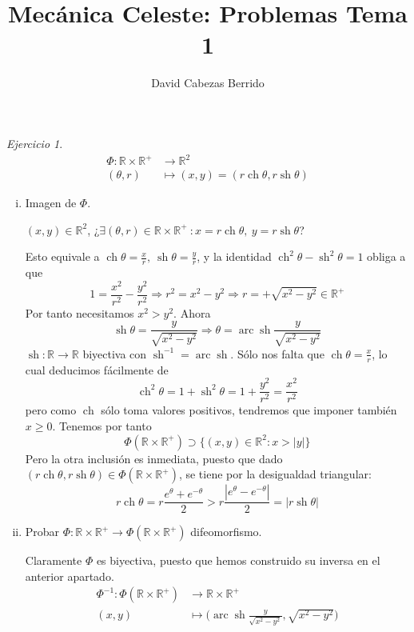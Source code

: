 \documentclass[12pt,spanish]{article}
\title{Mecánica Celeste: Problemas Tema 1}
\author{David Cabezas Berrido}
\date{}
\theoremstyle{definition}
\theoremstyle{remark}
\newtheorem{exercise}{Ejercicio}
\newcommand{\R}{\mathbb{R}}
\begin{document}
\maketitle

\newcommand{\ch}{\operatorname{ch}}
\newcommand{\sh}{\operatorname{sh}}
\newcommand{\ach}{\operatorname{arc}\ch}
\newcommand{\ash}{\operatorname{arc}\sh}

\setcounter{exercise}{4}
\begin{exercise}
  \begin{align*}
    \Phi : \R\times \mathbb{R}^+&\rightarrow\R^2 \\
    (\theta,r)&\mapsto (x,y)=(r\ch\theta,r\sh\theta)
  \end{align*}

  \begin{enumerate}[i)]
  \item Imagen de $\Phi$.

    $(x,y)\in\R^2$,
    ¿$\exists (\theta,r)\in\R\times\R^+\ : x=r\ch\theta,\ y=r\sh\theta$?

    Esto equivale a $\ch\theta =\frac{x}{r},\ \sh\theta = \frac{y}{r}$,
    y la identidad $\ch^2\theta-\sh^2\theta=1$ obliga a que
    \[1=\frac{x^2}{r^2}-\frac{y^2}{r^2}\Rightarrow
      r^2=x^2-y^2\Rightarrow r=+\sqrt{x^2-y^2}\in\R^+\]
    Por tanto necesitamos $x^2>y^2$. Ahora
    \[\sh\theta=\frac{y}{\sqrt{x^2-y^2}}\Rightarrow \theta = \ash\frac{y}{\sqrt{x^2-y^2}}\]
    $\sh:\R\rightarrow\R$ biyectiva con $\sh^{-1}=\ash$. Sólo nos
    falta que $\ch\theta=\frac{x}{r}$, lo cual deducimos fácilmente de
    \[\ch^2\theta=1+\sh^2\theta=1+\frac{y^2}{r^2}=\frac{x^2}{r^2}\]
    pero como $\ch$ sólo toma valores positivos, tendremos que imponer
    también $x\geq 0$. Tenemos por tanto
    \[\Phi(\R\times\R^+)\supset\{(x,y)\in\R^2:x>|y|\}\]
    Pero la otra inclusión es inmediata, puesto que dado
    $(r\ch\theta,r\sh\theta)\in\Phi(\R\times\R^+)$, se tiene por la
    desigualdad triangular:
    \[r\ch\theta = r\dfrac{e^\theta+e^{-\theta}}{2} >
    r\dfrac{|e^\theta-e^{-\theta}|}{2} = |r\sh\theta|\]

  \item Probar
    $\Phi : \R\times \mathbb{R}^+\rightarrow \Phi(\R\times\R^+)$
    difeomorfismo.

    Claramente $\Phi$ es biyectiva, puesto que hemos construido su
    inversa en el anterior apartado.
    \begin{align*}
      \Phi^{-1}: \Phi(\R\times\R^+)&\rightarrow\R\times\R^+ \\
      (x,y)&\mapsto \Big(\ash\frac{y}{\sqrt{x^2-y^2}},\sqrt{x^2-y^2}\Big)
    \end{align*}


\end{enumerate}
\end{exercise}
\end{document}
